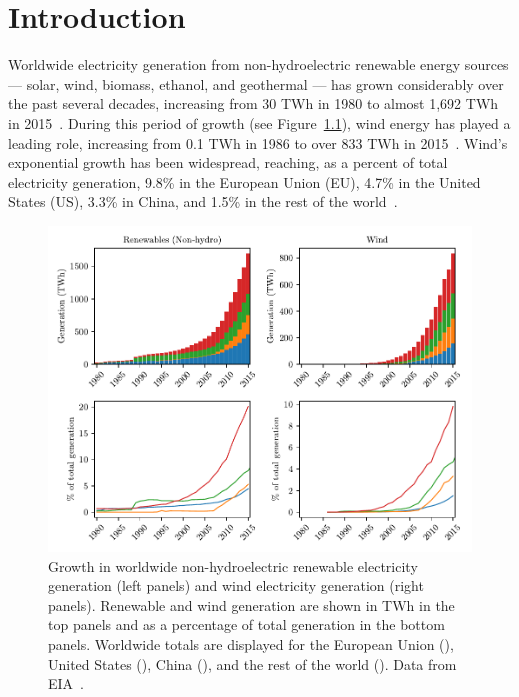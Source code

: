 \chapter{Introduction}
\label{chap:intro}

Worldwide electricity generation from non-hydroelectric renewable energy sources --- solar, wind, biomass, ethanol, and geothermal --- has grown considerably over the past several decades, increasing from 30 TWh in 1980 to almost 1,692 TWh in 2015~\cite{EIA2018a}. During this period of growth (see Figure~\ref{fig:gen-hist}), wind energy has played a leading role, increasing from 0.1 TWh in 1986 to over 833 TWh in 2015~\cite{EIA2018a}. Wind's exponential growth has been widespread, reaching, as a percent of total electricity generation, 9.8\% in the European Union (EU), 4.7\% in the United States (US), 3.3\% in China, and 1.5\% in the rest of the world~\cite{EIA2018a}. 

\begin{figure}[h!]
\includegraphics[width=\textwidth]{./wind-growth/gen-hist.pdf}
\caption{Growth in worldwide non-hydroelectric renewable electricity generation (left panels) and wind electricity generation (right panels). Renewable and wind generation are shown in TWh in the top panels and as a percentage of total generation in the bottom panels. Worldwide totals are displayed for the European Union ({\color{MPLred}\full}), United States ({\color{MPLgreen}\full}), China ({\color{MPLorange}\full}), and the rest of the world ({\color{MPLblue}\full}). Data from EIA~\cite{EIA2018a}.}
\label{fig:gen-hist}
\end{figure}

